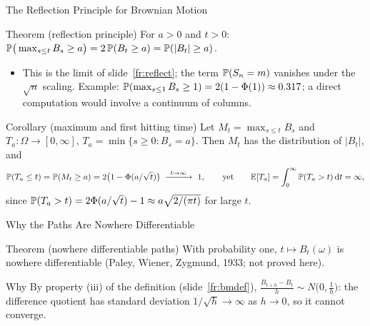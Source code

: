 \begin{frame}{The Reflection Principle for Brownian Motion}
  \label{fr:bmreflect}
  \small
  \begin{block}{Theorem (reflection principle)}
    For $a>0$ and $t>0$: \quad $\mathbb{P}\big(\max_{s\le t}B_s\ge a\big)=2\,\mathbb{P}(B_t\ge a)=\mathbb{P}(|B_t|\ge a)$.
  \end{block}
  \begin{itemize}
    \item This is the limit of slide~\ref{fr:reflect}; the term $\mathbb{P}(S_n=m)$ vanishes under the $\sqrt n$ scaling. Example: $\mathbb{P}(\max_{s\le1}B_s\ge1)=2(1-\Phi(1))\approx0.317$; a direct computation would involve a continuum of columns.
  \end{itemize}
  \begin{block}{Corollary (maximum and first hitting time)}
    Let $M_t=\max_{s\le t}B_s$ and $T_a\colon\Omega\to[0,\infty]$, $T_a=\min\{s\ge0 : B_s=a\}$. Then $M_t$ has the distribution of $|B_t|$, and
    \[
      \Prob(T_a\le t)=\Prob(M_t\ge a)=2\big(1-\Phi(a/\sqrt t)\big)\ \xrightarrow{\ t\to\infty\ }\ 1,\qquad\text{yet}\qquad \E[T_a]=\int_0^\infty\Prob(T_a>t)\dd t=\infty ,
    \]
    since $\mathbb{P}(T_a>t)=2\Phi(a/\sqrt t)-1\approx a\sqrt{2/(\pi t)}$ for large $t$.
  \end{block}
\end{frame}

\begin{frame}{Why the Paths Are Nowhere Differentiable}
  \label{fr:bmrough}
  \small
  \begin{block}{Theorem (nowhere differentiable paths)}
    With probability one, $t\mapsto B_t(\omega)$ is nowhere differentiable (Paley, Wiener, Zygmund, 1933; not proved here).
  \end{block}
  \begin{block}{Why}
    By property (iii) of the definition (slide~\ref{fr:bmdef}), $\frac{B_{t+h}-B_t}{h}\sim N\big(0,\tfrac1h\big)$: the difference quotient has standard deviation $1/\sqrt h\to\infty$ as $h\to0$, so it cannot converge.
  \end{block}
\end{frame}

